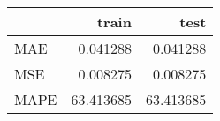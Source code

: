 \begin{tabular}{lrr}
\toprule
{} &      train &       test \\
\midrule
MAE  &   0.041288 &   0.041288 \\
MSE  &   0.008275 &   0.008275 \\
MAPE &  63.413685 &  63.413685 \\
\bottomrule
\end{tabular}
